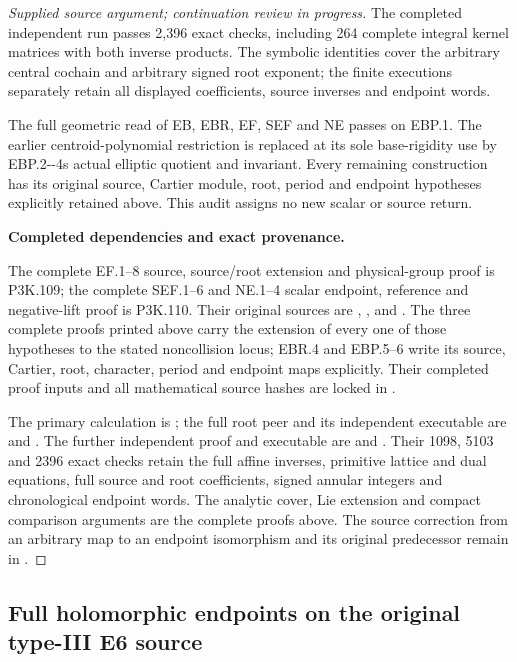 \begin{proof}[Supplied source argument; continuation review in progress]
The completed independent run passes 2,396 exact checks, including 264
complete integral kernel matrices with both inverse products. The
symbolic identities cover the arbitrary central cochain and arbitrary
signed root exponent; the finite executions separately retain all
displayed coefficients, source inverses and endpoint words.

The full geometric read of EB, EBR, EF, SEF and NE passes on EBP.1.
The earlier centroid-polynomial restriction is replaced at its sole
base-rigidity use by EBP.2-\/-4\textquotesingle s actual elliptic quotient and invariant.
Every remaining construction has its original source, Cartier module,
root, period and endpoint hypotheses explicitly retained above.
This audit assigns no new scalar or source return.




\par\medskip\noindent\textbf{Completed dependencies and exact provenance.}\par
The complete EF.1--8 source, source/root extension and physical-group
proof is P3K.109; the complete SEF.1--6 and NE.1--4 scalar endpoint,
reference and negative-lift proof is P3K.110. Their original sources are
,
, and
.
The three complete proofs printed above carry the extension of every
one of those hypotheses to the stated noncollision locus; EBR.4 and
EBP.5--6 write its source, Cartier, root, character, period and endpoint
maps explicitly. Their completed proof inputs and all mathematical
source hashes are locked in .

The primary calculation is
; the full root peer
and its independent executable are
 and
.
The further independent proof and executable are
 and
.
Their 1098, 5103 and 2396 exact checks retain the full affine inverses,
primitive lattice and dual equations, full source and root coefficients,
signed annular integers and chronological endpoint words. The analytic
cover, Lie extension and compact comparison arguments are the complete
proofs above. The source correction from an arbitrary map to an
endpoint isomorphism and its original predecessor remain in
.



\end{proof}


\subsection{Full holomorphic endpoints on the original type-III E6 source}
